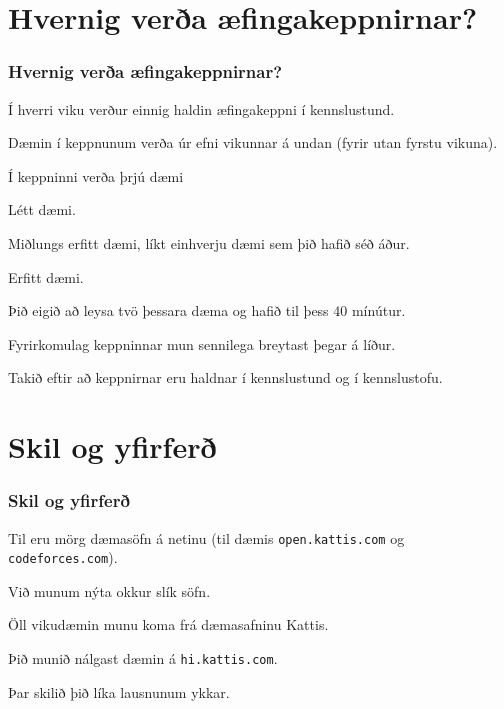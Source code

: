 \section{Hvernig verða æfingakeppnirnar?}
{
    \frametitle{Hvernig verða æfingakeppnirnar?}
    {
        \item<1-> Í hverri viku verður einnig haldin æfingakeppni í kennslustund.
        \item<2-> Dæmin í keppnunum verða úr efni vikunnar á undan (fyrir utan fyrstu vikuna).
        \item<3-> Í keppninni verða þrjú dæmi
        {
            \item<4-> Létt dæmi.
            \item<5-> Miðlungs erfitt dæmi, líkt einhverju dæmi sem þið hafið séð áður.
            \item<6-> Erfitt dæmi.
        }
        \item<7-> Þið eigið að leysa tvö þessara dæma og hafið til þess $40$ mínútur.
        \item<8-> Fyrirkomulag keppninnar mun sennilega breytast þegar á líður.
        \item<9-> Takið eftir að keppnirnar eru haldnar í kennslustund og í kennslustofu.
    }
}

\section{Skil og yfirferð}
{
    \frametitle{Skil og yfirferð}
    {
        \item<1-> Til eru mörg dæmasöfn á netinu (til dæmis \texttt{open.kattis.com} og \texttt{codeforces.com}).
        \item<2-> Við munum nýta okkur slík söfn.
        \item<3-> Öll vikudæmin munu koma frá dæmasafninu Kattis.
        \item<4-> Þið munið nálgast dæmin á \texttt{hi.kattis.com}.
        \item<5-> Þar skilið þið líka lausnunum ykkar.
    }
}

